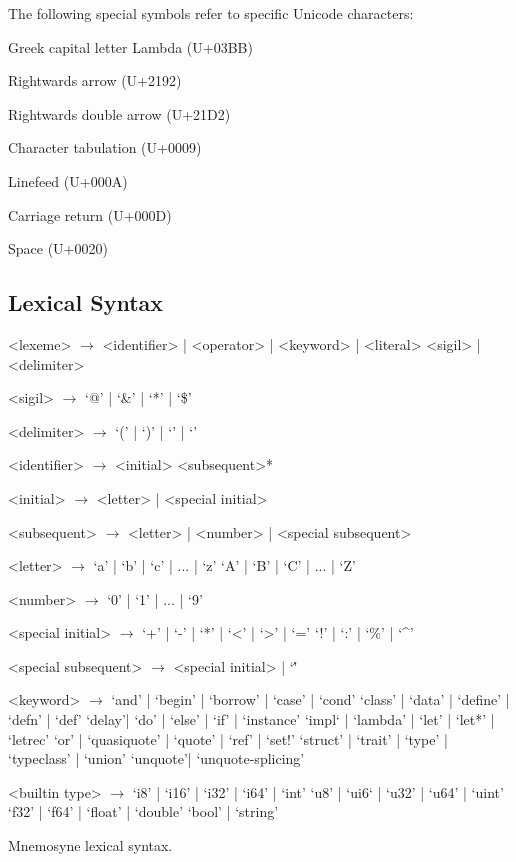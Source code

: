 The following special symbols refer to specific Unicode characters:
\begin{description}
    \item{} Greek capital letter Lambda (U+03BB)
    \item{} Rightwards arrow (U+2192)
    \item{} Rightwards double arrow (U+21D2)
    \item{} Character tabulation (U+0009)
    \item{} Linefeed (U+000A)
    \item{} Carriage return (U+000D)
    \item{} Space (U+0020)
\end{description}

\subsection{Lexical Syntax}
\setlength{\grammarindent}{6em}
\begin{listing}[H]
    \begin{grammar}
        <lexeme> $\to$ <identifier> | <operator> | <keyword> | <literal>
                    \alt <sigil> | <delimiter>

        <sigil> $\to$ `@' | `&' | `*' | `\$'

        <delimiter> $\to$ `(' | `)' | `{' | `}'

        <identifier> $\to$ <initial> <subsequent>*

        <initial> $\to$ <letter> | <special initial>

        <subsequent> $\to$ <letter> | <number> | <special subsequent>

        <letter> $\to$ `a' | `b' | `c' | ... | `z'
                 \alt `A' | `B' | `C' | ... | `Z'

        <number> $\to$ `0' | `1' | ... | `9'

        <special initial> $\to$ `+' | `-' | `*' | `<' | `>' | `='
                          \alt `!' | `:' | `\%' | `^'

        <special subsequent> $\to$ <special initial> | `\''

        <keyword> $\to$ `and' | `begin'  | `borrow' | `case' | `cond'
                  \alt `class' | `data' | `define' | `defn' | `def'
                  \alt `delay'| `do' | `else' | `if' | `instance'
                  \alt `impl` | `lambda' | `let' | `let*' | `letrec'
                  \alt `or' | `quasiquote' | `quote' | `ref' | `set!'
                  \alt `struct' | `trait' | `type' | `typeclass' | `union'
                  \alt `unquote'| `unquote-splicing'

        <builtin type> $\to$ `i8' | `i16' | `i32' | `i64' | `int'
                        \alt `u8' | `ui6` | `u32' | `u64' | `uint'
                        \alt `f32' | `f64' | `float' | `double'
                        \alt `bool' | `string'

    \end{grammar}
    \caption{Mnemosyne lexical syntax.}
\end{listing}
